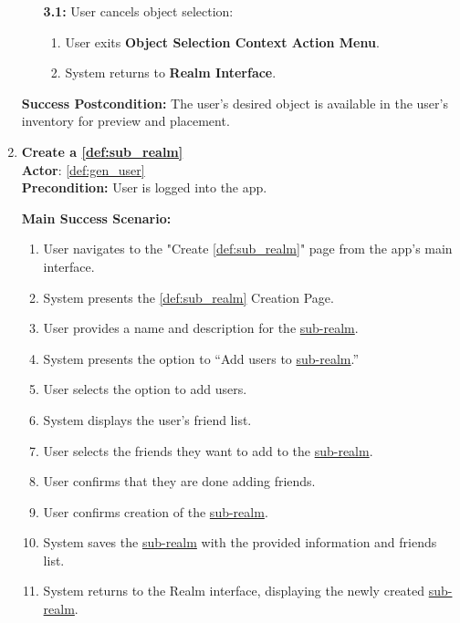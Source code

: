 \documentclass{article}
\begin{document}
\begin{enumerate}[label=\textbf{UC\arabic*}]
\begin{itemize}
              \item[{\bf 3.1:}] User cancels object selection:
                    \begin{enumerate}[label=\textbf{\arabic*.}]
                        \item User exits \textbf{Object Selection Context Action Menu}.
                        \item System returns to \textbf{Realm Interface}.
                    \end{enumerate}
          \end{itemize}

          \textbf{Success Postcondition:} The user’s desired object is available in the user’s inventory for preview and placement.


    \item \label{uc:17} \textbf{Create a \ref{def:sub_realm}} \\
          \textbf{Actor}: \ref{def:gen_user} \\
          \textbf{Precondition:} User is logged into the app.

          \textbf{Main Success Scenario:}
          \begin{enumerate}[label=\textbf{\arabic*.}]
              \item User navigates to the "Create \ref{def:sub_realm}" page from the app’s main interface.
              \item System presents the \ref{def:sub_realm} Creation Page.
              \item User provides a name and description for the \hyperref[def:sub_realm]{sub-realm}.
              \item System presents the option to “Add users to \hyperref[def:sub_realm]{sub-realm}.”
              \item User selects the option to add users.
              \item System displays the user’s friend list.
              \item User selects the friends they want to add to the \hyperref[def:sub_realm]{sub-realm}.
              \item User confirms that they are done adding friends.
              \item User confirms creation of the \hyperref[def:sub_realm]{sub-realm}.
              \item System saves the \hyperref[def:sub_realm]{sub-realm} with the provided information and friends list.
              \item System returns to the Realm interface, displaying the newly created \hyperref[def:sub_realm]{sub-realm}.
          \end{enumerate}


\end{enumerate}
\end{document}
